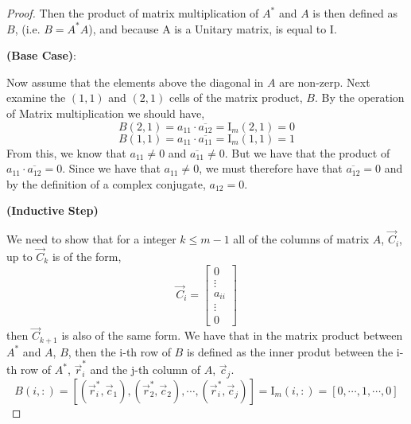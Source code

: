 \documentclass{article}
\begin{document}
\begin{enumerate}
\begin{proof}
Then the product of matrix multiplication of $A^*$ and $A$ is then defined as $B$, (i.e. $B = A^*A$), and because A is a Unitary matrix, is equal to $\mathrm{I}$. 

\textbf{(Base Case)}: 

Now assume that the elements above the diagonal in $A$ are non-zerp. Next examine the $(1, 1)$ and $(2, 1)$ cells of the matrix product, $B$. By the operation of Matrix multiplication we should have, 
\[
    B(2, 1) = a_{11} \cdot \overline{a_{12}} = \mathrm{I}_m(2, 1) = 0
\]
\[
    B(1, 1) = a_{11} \cdot \overline{a_{11}} = \mathrm{I}_m(1, 1) = 1
\]
From this, we know that $a_{11} \neq 0$ and $\overline{a_{11}} \neq 0$. But we have that the product of $a_{11} \cdot \overline{a_{12}} = 0$. Since we have that  $a_{11} \neq 0$, we must therefore have that $\overline{a_{12}} = 0$ and by the definition of a complex conjugate, $a_{12} = 0$. 

\textbf{(Inductive Step)}

We need to show that for a integer $k \le m-1$ all of the columns of matrix $A$, $\vec{C}_i$, up to $\vec{C}_k$ is of the form, 
\[
    \vec{C}_i = \left[\begin{array}{c}
                0 \\
                \vdots \\
                a_{ii} \\
                \vdots \\
                0
                \end{array}\right]
\]
then $\vec{C}_{k+1}$ is also of the same form. We have that in the matrix product between $A^*$ and $A$, $B$, then the i-th row of $B$ is defined as the inner produt between the i-th row of $A^*$, $\vec{r}_i^*$ and the j-th column of $A$, $\vec{c}_j$.  
\[
    B(i, :) = [(\vec{r}_i^*, \vec{c}_1), (\vec{r}_2^*, \vec{c}_2), \cdots, (\vec{r}_i^*, \vec{c}_j)] = \mathrm{I}_m(i, :) = [0, \cdots, 1, \cdots, 0]
\]


\end{proof}
\end{enumerate}
\end{document}
